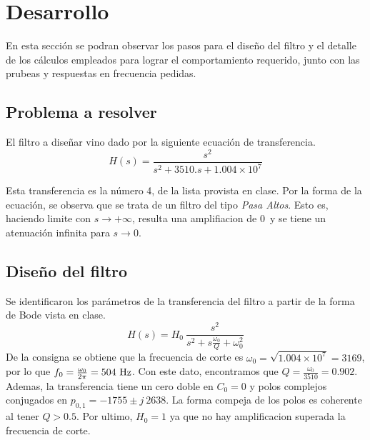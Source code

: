 \section*{Desarrollo}
En esta secci\'on se podran observar los pasos para el diseño del filtro y el detalle de los c\'alculos empleados para lograr el comportamiento requerido, junto con las prubeas y respuestas en frecuencia pedidas.\\


\subsection*{Problema a resolver}
El filtro a diseñar vino dado por la siguiente ecuaci\'on de transferencia. \\
\begin{equation}
	H(s)=\frac{s^2}{s^2+3510 . s+1.004\times10^7}	
\end{equation}


Esta transferencia es la n\'umero 4, de la lista provista en clase.
Por la forma de la ecuaci\'on, se observa que se trata de un filtro del tipo \textit{Pasa Altos}. Esto es, haciendo limite con $s \rightarrow +\infty$, resulta una amplifiacion de 0\dB \ y se tiene un atenuaci\'on infinita para $s\rightarrow 0$.

\subsection*{Diseño del filtro}
Se identificaron los par\'ametros de la transferencia del filtro a partir de la forma de Bode vista en clase.\\

\begin{equation}
  H(s)=H_0\ \frac{s^2}{s^2 +s \frac{\omega_0}{Q} +\omega_0^2}
\end{equation}
De la consigna se obtiene que la frecuencia de corte es 
$\omega_0=\sqrt{1.004\times10^7}=3169$, por lo que $f_0=\frac{\omega_0}{2\pi}=504\ \si{\hertz}$. Con este dato, encontramos que $Q=\frac{\omega_0}{3510}=0.902$.\\
Ademas, la transferencia tiene un cero doble en $C_0=0$ y polos complejos conjugados en $p_{0,1}= -1755\pm j\ 2638 $. La forma compeja de los polos es coherente al tener $Q>0.5$.
Por ultimo, $H_0 =1$  ya que no hay amplificacion superada la frecuencia de corte.\\
\pagebreak

